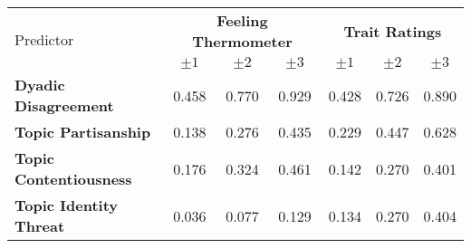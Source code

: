 \begin{tabular}{lccc ccc}
\hline
\multirow{2}{*}{Predictor} & \multicolumn{3}{c}{\textbf{Feeling Thermometer}} & \multicolumn{3}{c}{\textbf{Trait Ratings}} \\
 & $\pm1$ & $\pm2$ & $\pm3$ & $\pm1$ & $\pm2$ & $\pm3$ \\
\hline
\textbf{Dyadic Disagreement} & 0.458 & 0.770 & 0.929 & 0.428 & 0.726 & 0.890 \\
\textbf{Topic Partisanship} & 0.138 & 0.276 & 0.435 & 0.229 & 0.447 & 0.628 \\
\textbf{Topic Contentiousness} & 0.176 & 0.324 & 0.461 & 0.142 & 0.270 & 0.401 \\
\textbf{Topic Identity Threat} & 0.036 & 0.077 & 0.129 & 0.134 & 0.270 & 0.404 \\
\hline
\end{tabular}